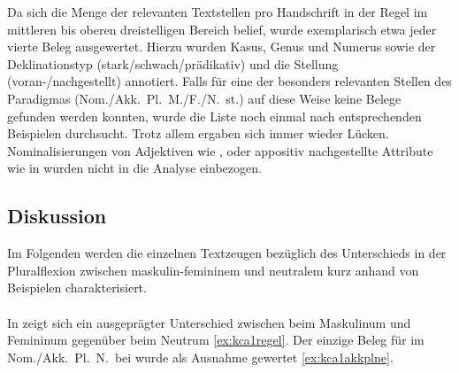 Da sich die Menge der relevanten Textstellen pro Handschrift in der Regel im
mittleren bis oberen dreistelligen Bereich belief, wurde exemplarisch etwa
jeder vierte Beleg ausgewertet. Hierzu wurden
Kasus, Genus und Numerus
sowie der Deklinationstyp (stark/schwach/prädikativ) und die Stellung
(voran-/nachgestellt) annotiert. Falls für eine der besonders relevanten
Stellen des Paradigmas (Nom./Akk.\ Pl.\ M./F./N.\ st.) auf diese Weise keine
Belege gefunden werden konnten, wurde die Liste noch einmal nach entsprechenden
Beispielen durchsucht. Trotz allem ergaben sich immer wieder Lücken.
Nominalisierungen von Adjektiven wie  ,
 oder appositiv nachgestellte Attribute wie in
  wurden nicht in die
Analyse einbezogen.

\subsection{Diskussion}
\label{subsec:kc_adjflex_disc}

Im Folgenden werden die einzelnen Textzeugen bezüglich des Unterschieds in der
Plural\-flexion zwischen maskulin-femininem  und neutralem
 kurz anhand von Beispielen charakterisiert.

\paragraph{\citet{kc:A1}}
In \citet{kc:A1} zeigt sich ein ausgeprägter Unterschied zwischen
 beim Maskulinum und Femininum gegenüber  beim Neutrum
\cref{ex:kca1regel}. Der einzige Beleg für  im Nom./Akk.\ Pl.\ N.\ bei
  wurde als Ausnahme gewertet \cref{ex:kca1akkplne}.

